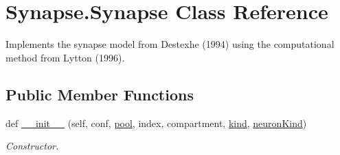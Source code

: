 \hypertarget{class_synapse_1_1_synapse}{}\section{Synapse.\+Synapse Class Reference}
\label{class_synapse_1_1_synapse}


Implements the synapse model from Destexhe (1994) using the computational method from Lytton (1996).  


\subsection*{Public Member Functions}
\begin{DoxyCompactItemize}
\item 
def \hyperlink{class_synapse_1_1_synapse_a07d8bf346901e5db0ba72d5397057bd2}{\+\_\+\+\_\+init\+\_\+\+\_\+} (self, conf, \hyperlink{class_synapse_1_1_synapse_a133990bf3ab7f1efa8b416be73d07a11}{pool}, index, compartment, \hyperlink{class_synapse_1_1_synapse_aa2ea45450a3ad13cfefcae9fabe6ce15}{kind}, \hyperlink{class_synapse_1_1_synapse_a031af2fe7be76f9b5f69c087228a1b9a}{neuron\+Kind})
\begin{DoxyCompactList}\small\item\em Constructor. \end{DoxyCompactList}\end{DoxyCompactItemize}
